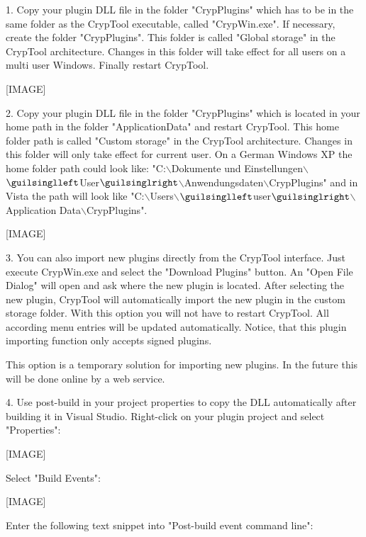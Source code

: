\hspace{20pt}1. Copy your plugin DLL file in the folder "CrypPlugins" which has to be in the same folder as the CrypTool executable, called "CrypWin.exe". If necessary, create the folder "CrypPlugins". This folder is called "Global storage" in the CrypTool architecture. Changes in this folder will take effect for all users on a multi user Windows. Finally restart CrypTool.

[IMAGE]

\hspace{20pt}2. Copy your plugin DLL file in the folder "CrypPlugins" which is located in your home path in the folder "ApplicationData" and restart CrypTool.  This home folder path is called "Custom storage" in the CrypTool architecture. Changes in this folder will only take effect for current user.  On a German Windows XP the home folder path could look like:
"C:$\backslash$Dokumente und Einstellungen$\backslash$$\guilsinglleft$User$\guilsinglright$$\backslash$Anwendungsdaten$\backslash$CrypPlugins" and in Vista the path will look like "C:$\backslash$Users$\backslash$$\guilsinglleft$user$\guilsinglright$$\backslash$Application Data$\backslash$CrypPlugins".

[IMAGE]

\hspace{20pt}3. You can also import new plugins directly from the CrypTool interface. Just execute CrypWin.exe and select the "Download Plugins" button. An "Open File Dialog" will open and ask where the new plugin is located. After selecting the new plugin, CrypTool will automatically import the new plugin in the custom storage folder. With this option you will not have to restart CrypTool. All according menu entries will be updated automatically.
Notice, that this plugin importing function only accepts signed plugins.

This option is a temporary solution for importing new plugins. In the future this will be done online by a web service.

\hspace{20pt}4. Use post-build in your project properties to copy the DLL automatically after building it in Visual Studio. Right-click on your plugin project and select "Properties": 

[IMAGE]

Select "Build Events": 

[IMAGE]

Enter the following text snippet into "Post-build event command line":

